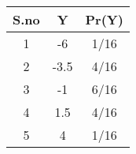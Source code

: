 
\begin{tabular}{|c|c|c|}
\hline
S.no	&Y	&Pr(Y)\\
\hline
1	&-6	&1/16\\\hline
2	&-3.5	&4/16\\\hline
3	&-1	&6/16\\\hline
4	&1.5	&4/16\\\hline
5	&4	&1/16\\
\hline
\end{tabular}
